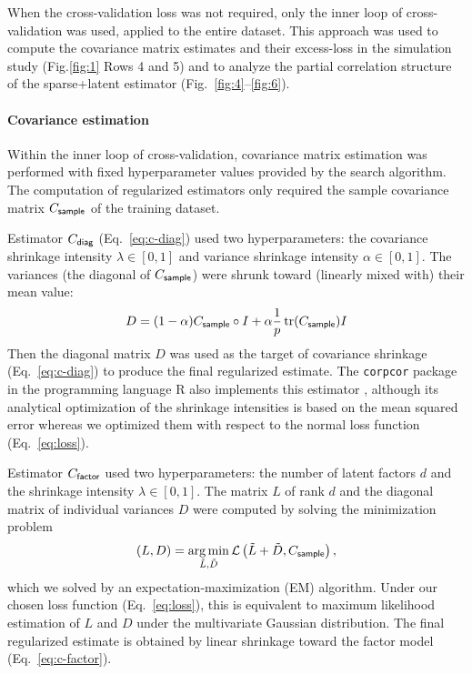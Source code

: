 \documentclass[10pt]{article}
\DeclareMathOperator{\Tr}{tr}
\newcommand{\figref}[2]{Fig.\;\ref{fig:#1}\,#2}
\newcommand{\loss}[1]{\mathcal L\left(#1\right)}
\DeclareMathOperator*{\argmin}{arg\,min}
\begin{document}
When the cross-validation loss was not required, only the inner loop of cross-validation was used, applied to the entire dataset.  This approach was used to compute the covariance matrix estimates and their excess-loss in the simulation study (\figref{1}{\,Rows 4 and 5}) and to analyze the partial correlation structure of the sparse+latent estimator (Fig.~\ref{fig:4}--\ref{fig:6}).
\paragraph{Covariance estimation}
Within the inner loop of cross-validation, covariance matrix estimation was performed with fixed hyperparameter values provided by the search algorithm.  The computation of regularized estimators only required the sample covariance matrix $C_{\sf sample}$ of the training dataset. 

Estimator $C_{\sf diag}$ (Eq.~\ref{eq:c-diag})  used two hyperparameters: the covariance shrinkage intensity $\lambda \in [0,1]$ and variance shrinkage intensity $\alpha \in [0,1]$.  The variances (the diagonal of $C_{\sf sample}$) were shrunk toward (linearly mixed with) their mean value:
\begin{equation}
D = (1-\alpha)C_{\sf sample}\circ I + \alpha \frac 1 p \Tr(C_{\sf sample}) I
\end{equation}
Then the diagonal matrix $D$ was used as the target of covariance shrinkage (Eq.~\ref{eq:c-diag}) to produce the final regularized estimate.  The {\tt corpcor} package in the programming language R also implements this estimator \cite{Schafer:2010}, although its analytical optimization of the shrinkage intensities is based on the mean squared error whereas we optimized them with respect to the normal loss function (Eq.~\ref{eq:loss}).

Estimator $C_{\sf factor}$ used two hyperparameters: the number of latent factors $d$ and the shrinkage intensity $\lambda \in [0, 1]$.  
The matrix $L$ of rank $d$ and the diagonal matrix of individual variances $D$ were computed by solving the minimization problem
\begin{equation}
(L,D) = \argmin\limits_{\tilde L,\tilde D} \loss{\tilde L + \tilde D,C_{\sf sample}},
\end{equation}
which we solved by an expectation-maximization (EM) algorithm.  Under our chosen loss function (Eq.~\ref{eq:loss}), this is equivalent to maximum likelihood estimation of $L$ and $D$ under the multivariate Gaussian distribution.  The final regularized estimate is obtained by linear shrinkage toward the factor model (Eq.~\ref{eq:c-factor}). 
\end{document}
